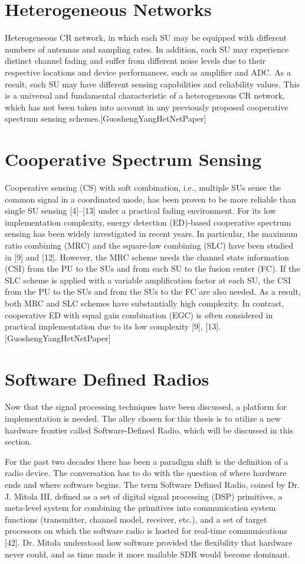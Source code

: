\section{Heterogeneous Networks}
Heterogeneous CR network, in which each SU may be equipped with different numbers of antennas and sampling
rates. In addition, each SU may experience distinct channel fading and suffer from different noise levels due to their respective
locations and device performances, such as amplifier and ADC. As a result, each SU may have different sensing capabilities
and reliability values. This is a universal and fundamental characteristic of a heterogeneous CR network, which has not
been taken into account in any previously proposed cooperative spectrum sensing schemes.[GuoshengYangHetNetPaper]

\section{Cooperative Spectrum Sensing}
Cooperative sensing (CS) with soft combination, i.e., multiple SUs sense the common signal in a coordinated mode,
has been proven to be more reliable than single SU sensing [4]–[13] under a practical fading environment. For its low
implementation complexity, energy detection (ED)-based cooperative spectrum sensing has been widely investigated in recent
years. In particular, the maximum ratio combining (MRC) and the square-law combining (SLC) have been studied in [9]
and [12]. However, the MRC scheme needs the channel state information (CSI) from the PU to the SUs and from each SU
to the fusion center (FC). If the SLC scheme is applied with a variable amplification factor at each SU, the CSI from the PU
to the SUs and from the SUs to the FC are also needed. As a result, both MRC and SLC schemes have substantially high
complexity. In contrast, cooperative ED with equal gain combination (EGC) is often considered in practical implementation
due to its low complexity [9], [13].[GuoshengYangHetNetPaper]


\section{Software Defined Radios}
Now that the signal processing techniques have been discussed, a platform for implementation is needed. The alley chosen for this thesis is to utilize a new hardware frontier
called Software-Defined Radio, which will be discussed in this section.

For the past two decades there has been a paradigm shift is the definition of a radio device. The conversation has to do with the question of where hardware ends and where
software begins. The term Software Defined Radio, coined by Dr. J. Mitola III, defined as a set of digital signal processing (DSP) primitives, a meta-level system for combining
the primitives into communication system functions (transmitter, channel model, receiver, etc.), and a set of target processors on which the software radio is hosted for real-time
communications [42]. Dr. Mitola understood how software provided the flexibility that hardware never could, and as time made it more mailable SDR would become dominant.

